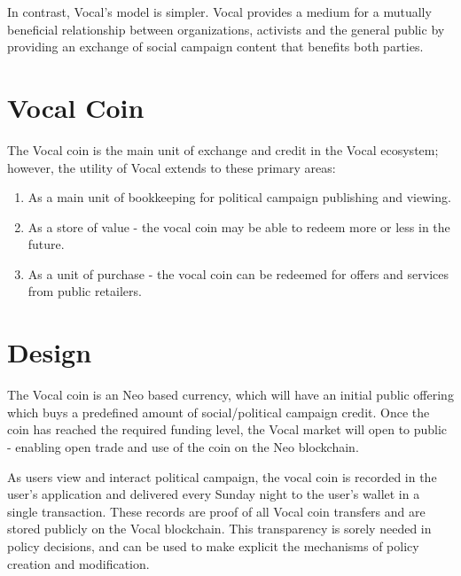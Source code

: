 \documentclass[conference]{IEEEtran}
\newcommand{\cmmnt}[1]{}
\begin{document}
    \cmmnt{TODO: insert relevant other example of blockchain powered campaign.}

    In contrast, Vocal's model is simpler. Vocal provides a medium for a mutually beneficial relationship between organizations, activists and the general public by providing an exchange of social campaign content that benefits both parties.


    \section{Vocal Coin}


    The Vocal coin is the main unit of exchange and credit in the Vocal ecosystem; however, the utility of Vocal extends to these primary areas:

    \begin{enumerate}
      \item As a main unit of bookkeeping for political campaign publishing and viewing.
      \item As a store of value - the vocal coin may be able to redeem more or less in the future.
      \item As a unit of purchase - the vocal coin can be redeemed for offers and services from public retailers.
    \end{enumerate}

    \section{Design}

    The Vocal coin is an Neo based currency, which will have an initial public offering which buys a predefined amount of social/political campaign credit. Once the coin has reached the required funding level, the Vocal market will open to public - enabling open trade and use of the coin on the Neo blockchain.

    As users view and interact political campaign, the vocal coin is recorded in the user's application and delivered every Sunday night to the user's wallet in a single transaction.
    These records are proof of all Vocal coin transfers and are stored publicly on the Vocal blockchain. This transparency is sorely needed in policy decisions, and can be used to make explicit the mechanisms of policy creation and modification.
\end{document}

